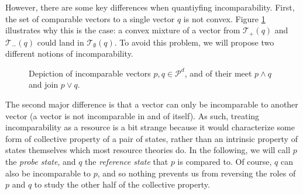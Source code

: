 However, there are some key differences when quantiyfing incomparability. First, the set of comparable vectors to a single vector $q$ is not convex. Figure \ref{fig:meet_join_incomp} illustrates why this is the case: a convex mixture of a vector from $\mathcal{T}_+(q)$ and $\mathcal{T}_-(q)$ could land in $\mathcal{T}_\emptyset(q)$. %
To avoid this problem, we will propose two different notions of incomparability.

\begin{figure}[h!] %
    \centering
    \caption{Depiction of incomparable vectors $p, q \in \mathcal{P}^d$, and of their meet $p \wedge q$ and join $p \vee q$.}
    \label{fig:meet_join_incomp}
\end{figure}

The second major difference is that a vector can only be incomparable to another vector (a vector is not incomparable in and of itself). As such, treating incomparability as a resource is a bit strange because it would characterize some form of collective property of a pair of states, rather than an intrinsic property of states themselves which most resource theories do. In the following, we will call $p$ the \textit{probe state}, and $q$ the \textit{reference state} that $p$ is compared to. Of course, $q$ can also be incomparable to $p$, and so nothing prevents us from reversing the roles of $p$ and $q$ to study the other half of the collective property.



